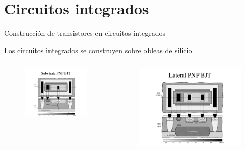 \documentclass[t,aspectratio=169]{beamer}
\begin{document}
\section{Circuitos integrados}
\begin{frame}{Construcción de transistores en circuitos integrados}

Los circuitos integrados se construyen sobre obleas de silicio.

\begin{columns}
\begin{column}{0.5\textwidth}

\begin{figure}
    \centering
    \includegraphics[width=\textwidth]{figures/vertical_pnp_bjt.jpg}
\end{figure}

\end{column}
\begin{column}{0.5\textwidth}

\begin{figure}
    \centering
    \includegraphics[width=\textwidth]{figures/lateral_pnp_bjt.jpg}
\end{figure}

\end{column}
\end{columns}

\end{frame}
\end{document}
